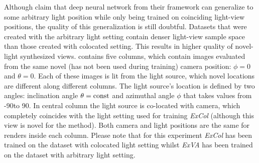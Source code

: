 Although \cite{bi2020neural} claim that deep neural network from their framework
can generalize to some arbitrary light position while only being trained on coinciding light-view positions,
the quality of this generalization is still doubtful.
Datasets that were created with the arbitrary light setting
contain denser light-view sample space than those created with colocated setting.
This results in higher quality of novel-light synthesized views.
 contains five columns,
which contain images evaluated from the same novel (has not been used during training) camera position: $\phi = 0$ and $\theta = 0$.
Each of these images is lit from the light source,
which novel locations are different along different columns.
The light source's location is defined by two angles:
inclination angle $\theta = \mathrm{const}$ and azimuthal angle $\phi$
that takes values from -90\textdegree to 90\textdegree.
In central column the light source is co-located with camera,
which completely coincides with the light setting used for training \textit{ExCol}
(although this view is novel for the method).
Both camera and light positions are the same for renders inside each column.
Please note that for this experiment \textit{ExCol} has been trained on the dataset with colocated light setting
whilst \textit{ExVA} has been trained on the dataset with arbitrary light setting.

